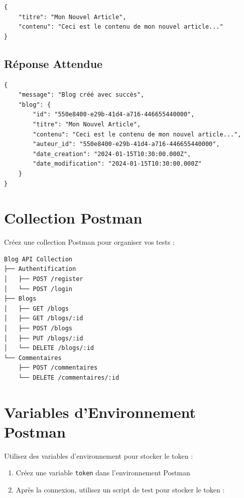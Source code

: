 \begin{lstlisting}[style=javascript]
{
    "titre": "Mon Nouvel Article",
    "contenu": "Ceci est le contenu de mon nouvel article..."
}
\end{lstlisting}

\subsection{Réponse Attendue}

\begin{lstlisting}[style=javascript]
{
    "message": "Blog créé avec succès",
    "blog": {
        "id": "550e8400-e29b-41d4-a716-446655440000",
        "titre": "Mon Nouvel Article",
        "contenu": "Ceci est le contenu de mon nouvel article...",
        "auteur_id": "550e8400-e29b-41d4-a716-446655440000",
        "date_creation": "2024-01-15T10:30:00.000Z",
        "date_modification": "2024-01-15T10:30:00.000Z"
    }
}
\end{lstlisting}

\section{Collection Postman}

Créez une collection Postman pour organiser vos tests :

\begin{lstlisting}[style=bash, caption=Structure de collection Postman]
Blog API Collection
├── Authentification
│   ├── POST /register
│   └── POST /login
├── Blogs
│   ├── GET /blogs
│   ├── GET /blogs/:id
│   ├── POST /blogs
│   ├── PUT /blogs/:id
│   └── DELETE /blogs/:id
└── Commentaires
    ├── POST /commentaires
    └── DELETE /commentaires/:id
\end{lstlisting}

\section{Variables d'Environnement Postman}

Utilisez des variables d'environnement pour stocker le token :

\begin{enumerate}
    \item Créez une variable \texttt{token} dans l'environnement Postman
    \item Après la connexion, utilisez un script de test pour stocker le token :
\end{enumerate}

